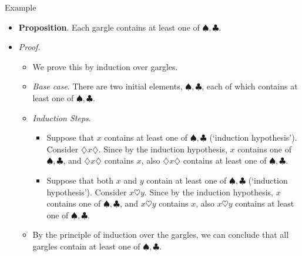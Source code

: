 \begin{frame}{Example}

	\begin{itemize}

		\item \textbf{Proposition}. Each gargle contains at least one of $\spadesuit,\clubsuit$.
		
		\item \emph{Proof}.
		
			\begin{itemize}

				\item We prove this by induction over gargles.
				
				\item \emph{Base case}. There are two initial elements, $\spadesuit,\clubsuit$, each of which contains at least one of $\spadesuit,\clubsuit$.
				
				\item \emph{Induction Steps}. \begin{itemize}
				
					\item Suppose that $x$ contains at least one of $\spadesuit,\clubsuit$ (`induction hypothesis'). Consider $\diamondsuit x \diamondsuit$. Since by the induction hypothesis, $x$ contains one of $\spadesuit,\clubsuit$, and $\diamondsuit x \diamondsuit$ contains $x$, also $\diamondsuit x \diamondsuit$ contains at least one of $\spadesuit,\clubsuit$.
					
					\item Suppose that  both $x$ and $y$ contain at least one of $\spadesuit,\clubsuit$ (`induction hypothesis'). Consider $ x \heartsuit y$. Since by the induction hypothesis, $x$ contains one of $\spadesuit,\clubsuit$, and $x \heartsuit y$ contains $x$, also $x \heartsuit y$ contains at least one of $\spadesuit,\clubsuit$.

				
				\end{itemize}
				
				\item By the principle of induction over the gargles, we can conclude that all gargles contain at least one of $\spadesuit,\clubsuit$.

			\end{itemize}
	
	\end{itemize}

\end{frame}


